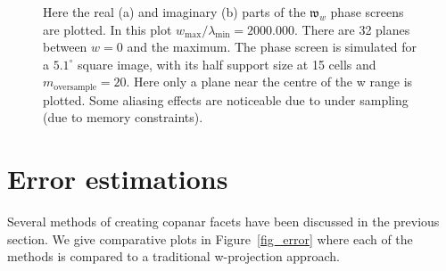 \begin{figure}[h]
\begin{mdframed}
\begin{subfigure}[b]{0.33\textwidth}
      \caption{}
    \end{subfigure}
    \caption[Sample w phase screens]{Here the real (a) and imaginary (b) parts of the $\mathfrak{w}_w$ phase screens are plotted. 
	    In this plot $w_{\text{max}}/\lambda_{\text{min}} = 2000.000$. There are 32 planes between $w=0$ and the maximum.
	    The phase screen is simulated for a $5.1^\circ$ square image, with its half support size at 15 cells and $m_{\text{oversample}}=20$.
	    Here only a plane near the centre of the w range is plotted. Some aliasing effects are noticeable due to under sampling (due to memory
	    constraints).}
    \label{fig_phase_screen}
  \end{mdframed}
\end{figure}
\section{Error estimations}
Several methods of creating copanar facets have been discussed in the previous section. We give comparative plots in Figure~\ref{fig_error} where each of the methods is compared to
a traditional w-projection approach.
